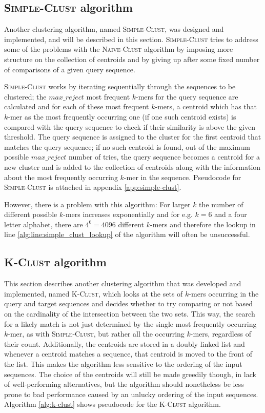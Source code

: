 \subsection{\textsc{Simple-Clust} algorithm}

Another clustering algorithm, named \textsc{Simple-Clust}, was designed and
implemented, and will be described in this section. \textsc{Simple-Clust} tries
to address some of the problems with the \textsc{Naive-Clust} algorithm by
imposing more structure on the collection of centroids and by giving up after
some fixed number of comparisons of a given query sequence.

\textsc{Simple-Clust} works by iterating sequentially through the sequences to
be clustered; the $max\_reject$ most frequent $k$-mers for the query sequence
are calculated and for each of these most frequent $k$-mers, a centroid which
has that $k$-mer as the most frequently occurring one (if one such centroid
exists) is compared with the query sequence to check if their similarity is
above the given threshold. The query sequence is assigned to the cluster for
the first centroid that matches the query sequence; if no such centroid is
found, out of the maximum possible $max\_reject$ number of tries, the query
sequence becomes a centroid for a new cluster and is added to the collection of
centroids along with the information about the most frequently occurring
$k$-mer in the sequence. Pseudocode for \textsc{Simple-Clust} is attached in
appendix \ref{app:simple-clust}.

However, there is a problem with this algorithm: For larger $k$ the number of
different possible $k$-mers increases exponentially and for e.g. $k = 6$ and a
four letter alphabet, there are $4^6 = 4096$ different $k$-mers and therefore
the lookup in line \ref{alg:line:simple_clust_lookup} of the algorithm will
often be unsuccessful.


\subsection{\textsc{K-Clust} algorithm}
\label{sec:k-clust_algorithm}

This section describes another clustering algorithm that was developed and
implemented, named \textsc{K-Clust}, which looks at the sets of $k$-mers
occurring in the query and target sequences and decides whether to try
comparing or not based on the cardinality of the intersection between the two
sets. This way, the search for a likely match is not just determined by the
single most frequently occurring $k$-mer, as with \textsc{Simple-Clust}, but
rather all the occurring $k$-mers, regardless of their count. Additionally, the
centroids are stored in a doubly linked list and whenever a centroid matches a
sequence, that centroid is moved to the front of the list. This makes the
algorithm less sensitive to the ordering of the input sequences. The choice of
the centroids will still be made greedily though, in lack of well-performing
alternatives, but the algorithm should nonetheless be less prone to bad
performance caused by an unlucky ordering of the input sequences. Algorithm
\ref{alg:k-clust} shows pseudocode for the \textsc{K-Clust} algorithm.

